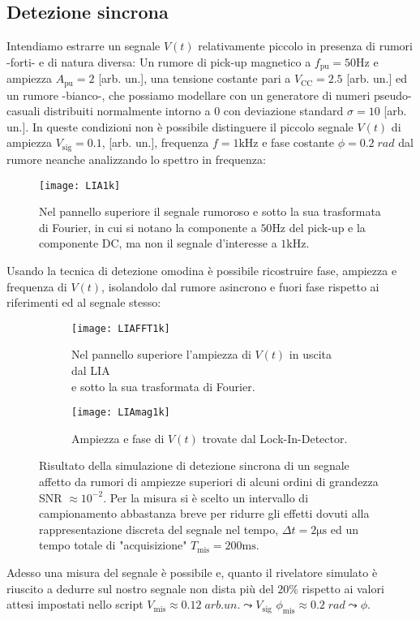 \documentclass{article}[a4paper, oneside, 11pt]
\begin{document}
\subsection{Detezione sincrona}
Intendiamo estrarre un segnale $V(t)$ relativamente piccolo
in presenza di rumori -forti- e di natura diversa:
Un rumore di pick-up magnetico a $f_{\text{pu}} = 50 \si{\Hz}$ e ampiezza
$A_{\text{pu}} = 2$ [arb. un.], una tensione costante pari a 
$V_{\text{CC}} = 2.5$ [arb. un.] ed un rumore -bianco-, che possiamo modellare
con un generatore di numeri pseudo-casuali distribuiti normalmente
intorno a $0$ con deviazione standard $\sigma = 10$ [arb. un.].
In queste condizioni non è possibile distinguere il piccolo segnale $V(t)$ 
di ampiezza $V_{\text{sig}} = 0.1$, [arb. un.], frequenza 
$f = 1 \si{\kilo\hertz}$ e fase costante $\phi = 0.2 \; \si{rad}$
dal rumore neanche analizzando lo spettro in frequenza:
\begin{figure}[!htb]
\centering
	\texttt{[image: LIA1k]}
	\caption{Nel pannello superiore il segnale rumoroso e sotto la sua
			trasformata di Fourier, in cui si notano la componente a
			$50 \si{\Hz}$ del pick-up e la componente DC, ma non il segnale
			d'interesse a $1 \si{\kilo\hertz}$. \label{fig: LIAnoise}}
\end{figure}
Usando la tecnica di detezione omodina è possibile ricostruire fase,
ampiezza e frequenza di $V(t)$, isolandolo dal rumore asincrono e fuori
fase rispetto ai riferimenti ed al segnale stesso:
\begin{figure}[!htb]
	\centering
	\begin{subfigure}{.5\textwidth}
		\texttt{[image: LIAFFT1k]}
		\caption{Nel pannello superiore l'ampiezza di $V(t)$ in uscita dal LIA \\
				\; e sotto la sua trasformata di Fourier.}
	\end{subfigure}%
	\begin{subfigure}{.5\textwidth}
		\texttt{[image: LIAmag1k]}
		\caption{Ampiezza e fase di $V(t)$ trovate dal Lock-In-Detector.}
	\end{subfigure}
	\caption{Risultato della simulazione di detezione sincrona di un segnale
			affetto da rumori di ampiezze superiori di alcuni ordini di
			grandezza SNR $\approx 10^{-2}$. Per la misura si è scelto un
			intervallo di campionamento abbastanza breve per ridurre
			gli effetti dovuti alla rappresentazione discreta del segnale
			nel tempo, $\Delta t = 2 \si{\micro\s}$ ed un tempo totale di
			"acquisizione" $T_{\text{mis}} = 200 \si{\ms}$.
		\label{fig: LIAall}}
\end{figure}
Adesso una misura del segnale è possibile e, quanto il rivelatore simulato è
riuscito a dedurre sul nostro segnale non dista più del $20 \%$ rispetto ai
valori attesi impostati nello script $V_{\text{mis}} \approx 0.12 \;
\si{arb. un.} \leadsto V_{\text{sig}}$ $\phi_{\text{mis}} \approx 0.2 \;
\si{rad} \leadsto \phi$.
\end{document}
